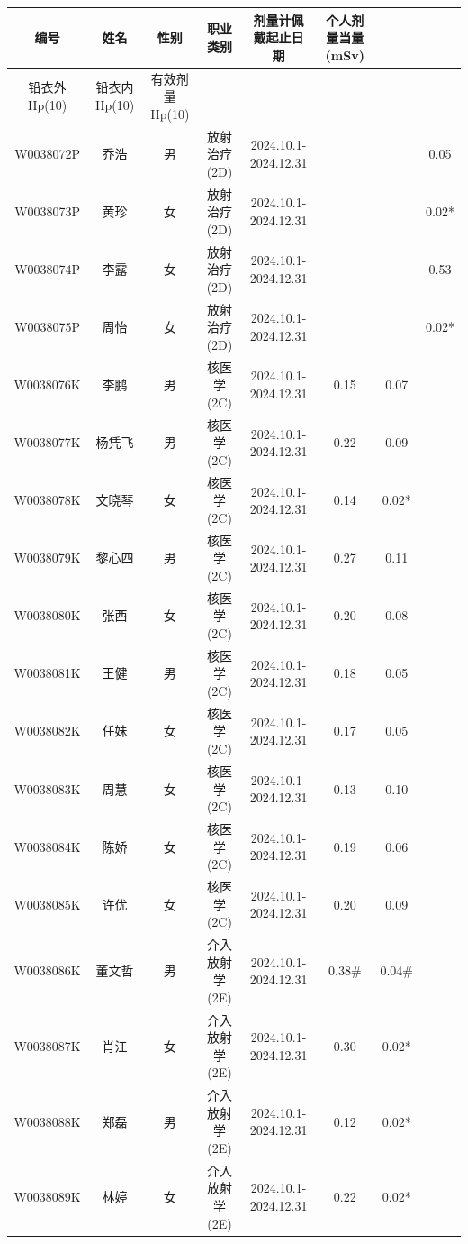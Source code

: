 \begin{table}[H]
\centering
\begin{tabular}{|c|c|c|c|c|c|c|c|}
\hline
编号 & 姓名 & 性别 & 职业类别 & 剂量计佩戴起止日期 & 个人剂量当量(mSv) &  &  \\
\hline
铅衣外Hp(10) & 铅衣内Hp(10) & 有效剂量Hp(10) &  &  &  &  &  \\
\hline
W0038072P & 乔浩 & 男 & 放射治疗(2D) & 2024.10.1-2024.12.31 &  &  & 0.05 \\
\hline
W0038073P & 黄珍 & 女 & 放射治疗(2D) & 2024.10.1-2024.12.31 &  &  & 0.02* \\
\hline
W0038074P & 李露 & 女 & 放射治疗(2D) & 2024.10.1-2024.12.31 &  &  & 0.53 \\
\hline
W0038075P & 周怡 & 女 & 放射治疗(2D) & 2024.10.1-2024.12.31 &  &  & 0.02* \\
\hline
W0038076K & 李鹏 & 男 & 核医学(2C) & 2024.10.1-2024.12.31 & 0.15 & 0.07 &  \\
\hline
W0038077K & 杨凭飞 & 男 & 核医学(2C) & 2024.10.1-2024.12.31 & 0.22 & 0.09 &  \\
\hline
W0038078K & 文晓琴 & 女 & 核医学(2C) & 2024.10.1-2024.12.31 & 0.14 & 0.02* &  \\
\hline
W0038079K & 黎心四 & 男 & 核医学(2C) & 2024.10.1-2024.12.31 & 0.27 & 0.11 &  \\
\hline
W0038080K & 张西 & 女 & 核医学(2C) & 2024.10.1-2024.12.31 & 0.20 & 0.08 &  \\
\hline
W0038081K & 王健 & 男 & 核医学(2C) & 2024.10.1-2024.12.31 & 0.18 & 0.05 &  \\
\hline
W0038082K & 任妹 & 女 & 核医学(2C) & 2024.10.1-2024.12.31 & 0.17 & 0.05 &  \\
\hline
W0038083K & 周慧 & 女 & 核医学(2C) & 2024.10.1-2024.12.31 & 0.13 & 0.10 &  \\
\hline
W0038084K & 陈娇 & 女 & 核医学(2C) & 2024.10.1-2024.12.31 & 0.19 & 0.06 &  \\
\hline
W0038085K & 许优 & 女 & 核医学(2C) & 2024.10.1-2024.12.31 & 0.20 & 0.09 &  \\
\hline
W0038086K & 董文哲 & 男 & 介入放射学(2E) & 2024.10.1-2024.12.31 & 0.38\# & 0.04\# &  \\
\hline
W0038087K & 肖江 & 女 & 介入放射学(2E) & 2024.10.1-2024.12.31 & 0.30 & 0.02* &  \\
\hline
W0038088K & 郑磊 & 男 & 介入放射学(2E) & 2024.10.1-2024.12.31 & 0.12 & 0.02* &  \\
\hline
W0038089K & 林婷 & 女 & 介入放射学(2E) & 2024.10.1-2024.12.31 & 0.22 & 0.02* &  \\

\end{tabular}
\end{table}

